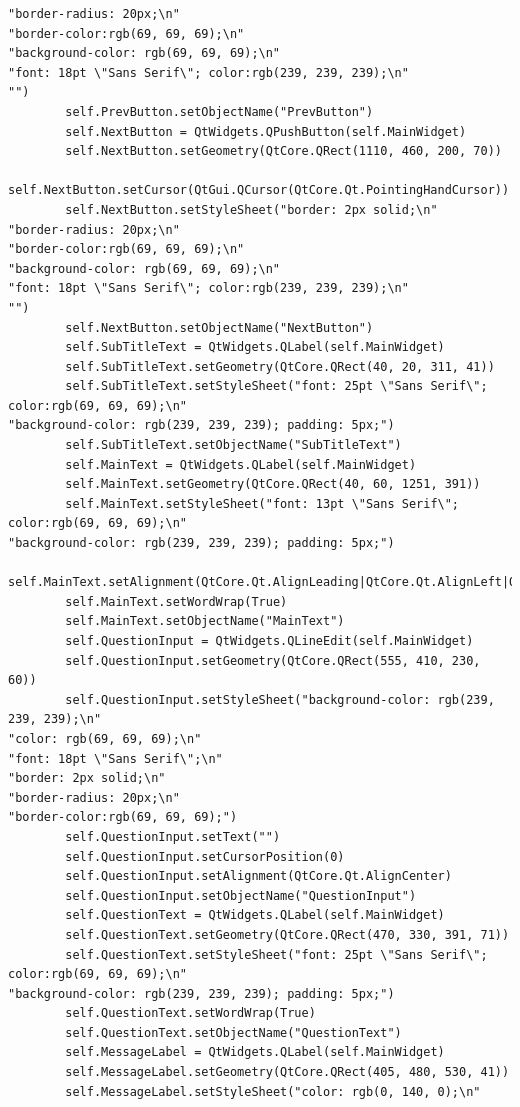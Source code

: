 \documentclass{article}
\begin{document}
\begin{lstlisting}
"border-radius: 20px;\n"
"border-color:rgb(69, 69, 69);\n"
"background-color: rgb(69, 69, 69);\n"
"font: 18pt \"Sans Serif\"; color:rgb(239, 239, 239);\n"
"")
        self.PrevButton.setObjectName("PrevButton")
        self.NextButton = QtWidgets.QPushButton(self.MainWidget)
        self.NextButton.setGeometry(QtCore.QRect(1110, 460, 200, 70))
        self.NextButton.setCursor(QtGui.QCursor(QtCore.Qt.PointingHandCursor))
        self.NextButton.setStyleSheet("border: 2px solid;\n"
"border-radius: 20px;\n"
"border-color:rgb(69, 69, 69);\n"
"background-color: rgb(69, 69, 69);\n"
"font: 18pt \"Sans Serif\"; color:rgb(239, 239, 239);\n"
"")
        self.NextButton.setObjectName("NextButton")
        self.SubTitleText = QtWidgets.QLabel(self.MainWidget)
        self.SubTitleText.setGeometry(QtCore.QRect(40, 20, 311, 41))
        self.SubTitleText.setStyleSheet("font: 25pt \"Sans Serif\"; color:rgb(69, 69, 69);\n"
"background-color: rgb(239, 239, 239); padding: 5px;")
        self.SubTitleText.setObjectName("SubTitleText")
        self.MainText = QtWidgets.QLabel(self.MainWidget)
        self.MainText.setGeometry(QtCore.QRect(40, 60, 1251, 391))
        self.MainText.setStyleSheet("font: 13pt \"Sans Serif\"; color:rgb(69, 69, 69);\n"
"background-color: rgb(239, 239, 239); padding: 5px;")
        self.MainText.setAlignment(QtCore.Qt.AlignLeading|QtCore.Qt.AlignLeft|QtCore.Qt.AlignTop)
        self.MainText.setWordWrap(True)
        self.MainText.setObjectName("MainText")
        self.QuestionInput = QtWidgets.QLineEdit(self.MainWidget)
        self.QuestionInput.setGeometry(QtCore.QRect(555, 410, 230, 60))
        self.QuestionInput.setStyleSheet("background-color: rgb(239, 239, 239);\n"
"color: rgb(69, 69, 69);\n"
"font: 18pt \"Sans Serif\";\n"
"border: 2px solid;\n"
"border-radius: 20px;\n"
"border-color:rgb(69, 69, 69);")
        self.QuestionInput.setText("")
        self.QuestionInput.setCursorPosition(0)
        self.QuestionInput.setAlignment(QtCore.Qt.AlignCenter)
        self.QuestionInput.setObjectName("QuestionInput")
        self.QuestionText = QtWidgets.QLabel(self.MainWidget)
        self.QuestionText.setGeometry(QtCore.QRect(470, 330, 391, 71))
        self.QuestionText.setStyleSheet("font: 25pt \"Sans Serif\"; color:rgb(69, 69, 69);\n"
"background-color: rgb(239, 239, 239); padding: 5px;")
        self.QuestionText.setWordWrap(True)
        self.QuestionText.setObjectName("QuestionText")
        self.MessageLabel = QtWidgets.QLabel(self.MainWidget)
        self.MessageLabel.setGeometry(QtCore.QRect(405, 480, 530, 41))
        self.MessageLabel.setStyleSheet("color: rgb(0, 140, 0);\n"

\end{lstlisting}
\end{document}
